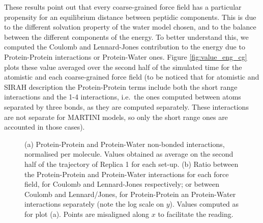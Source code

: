 These results point out that every coarse-grained force field has a particular propensity for an equilibrium distance between peptidic components. This is due to the different solvation property of the water model chosen, and to the balance between the different components of the energy. To better understand this, we computed the Coulomb and Lennard-Jones contribution to the energy due to Protein-Protein interactions or Protein-Water ones.
%
Figure \ref{fig:value_eng_cg} plots these value averaged over the second half of the simulated time for the atomistic and each coarse-grained force field (to be noticed that for atomistic and SIRAH description the Protein-Protein terms include both the short range interactions and the 1-4 interactions, i.e.\ the ones computed between atoms separated by three bonds, as they are computed separately. These interactions are not separate for MARTINI models, so only the short range ones are accounted in those cases).

\begin{figure}[h!]
\centering
\vspace{3cm}
\caption[Non-bonded protein energy contribution to capsule structures]{(a) Protein-Protein and Protein-Water non-bonded interactions, normalised per molecule. Values obtained as average on the second half of the trajectory of Replica 1 for each set-up. (b) Ratio between the Protein-Protein and Protein-Water interactions for each force field, for Coulomb and Lennard-Jones respectively; or between Coulomb and Lennard/Jones, for Protein-Protein an Protein-Water interactions separately (note the log scale on $y$). Values computed as for plot (a). Points are misaligned along $x$ to facilitate the reading.}
\label{fig:eng_cg}
\vspace{3cm}
\end{figure}


